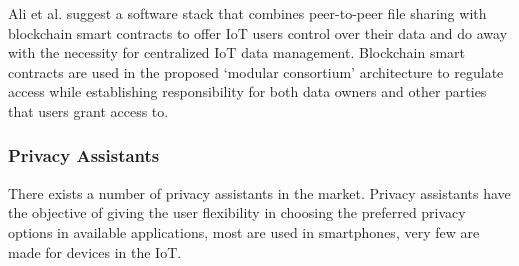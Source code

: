 Ali et al. \cite{AliIoT} suggest a software stack that combines peer-to-peer
file sharing with blockchain smart contracts to offer IoT users control
over their data and do away with the necessity for centralized IoT data
management. Blockchain smart contracts are used in the proposed `modular
consortium' architecture to regulate access while establishing responsibility
for both data owners and other parties that users grant access to.

\subsubsection{Privacy Assistants}

There exists a number of privacy assistants in the market. Privacy assistants
have the objective of giving the user flexibility in choosing the preferred
privacy options in available applications, most are used in smartphones,
very few are made for devices in the IoT.


